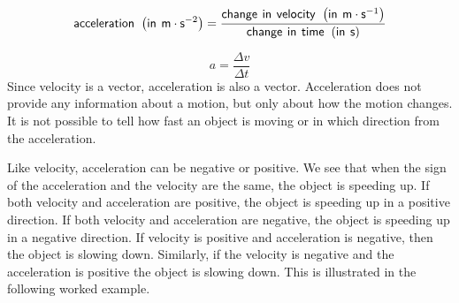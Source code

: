     \begin{equation}
    \mathsf{acceleration}\phantom{\rule{4pt}{0ex}}\left(\mathsf{in}\phantom{\rule{4pt}{0ex}}\mathsf{m}\ensuremath{\cdot}{\mathsf{s}}^{-2}\right)=\frac{\mathsf{change}\phantom{\rule{4pt}{0ex}}\mathsf{in}\phantom{\rule{4pt}{0ex}}\mathsf{velocity}\phantom{\rule{4pt}{0ex}}\left(\mathsf{in}\phantom{\rule{4pt}{0ex}}\mathsf{m}\ensuremath{\cdot}{\mathsf{s}}^{-1}\right)}{\mathsf{change}\phantom{\rule{4pt}{0ex}}\mathsf{in}\phantom{\rule{4pt}{0ex}}\mathsf{time}\phantom{\rule{4pt}{0ex}}\left(\mathsf{in}\phantom{\rule{4pt}{0ex}}\mathsf{s}\right)}
      \end{equation}
      \label{m38794*id67742}\nopagebreak\noindent{}
        
    \begin{equation}
    a=\frac{\Delta v}{\Delta t}
      \end{equation}
      \label{m38794*id67769}Since velocity is a vector, acceleration is also a vector. Acceleration does not provide any information about a motion, but only about how the motion changes. It is not possible to tell how fast an object is moving or in which direction from the acceleration.\par 
      \label{m38794*id67775}Like velocity, acceleration can be negative or positive. We see that when the sign of the acceleration and the velocity are the same, the object is speeding up. If both velocity and acceleration are positive, the object is speeding up in a positive direction. If both velocity and acceleration are negative, the object is speeding up in a negative direction.
If velocity is positive and acceleration is negative, then the object is slowing down. Similarly, if the velocity is negative and the acceleration is positive the object is slowing down. This is illustrated in the following worked example.\par \vspace{-1cm}
